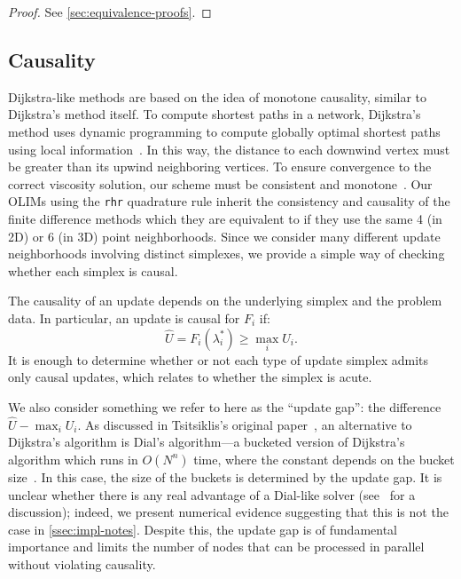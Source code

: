 \documentclass{article}
\begin{document}
\begin{proof}
  See \cref{sec:equivalence-proofs}.
\end{proof}

\subsection{Causality}\label{ssec:causality} Dijkstra-like
methods are based on the idea of monotone causality, similar to
Dijkstra's method itself. To compute shortest paths in a network,
Dijkstra's method uses dynamic programming to compute globally optimal
shortest paths using local information~\cite{dijkstra1959note}. In
this way, the distance to each downwind vertex must be greater than
its upwind neighboring vertices. To ensure convergence to the correct
viscosity solution, our scheme must be consistent and
monotone~\cite{crandall1983viscosity}. Our OLIMs using the
\texttt{rhr} quadrature rule inherit the consistency and causality of
the finite difference methods which they are equivalent to if they use
the same 4 (in 2D) or 6 (in 3D) point neighborhoods. Since we consider
many different update neighborhoods involving distinct simplexes, we
provide a simple way of checking whether each simplex is causal.

The causality of an update depends on the underlying simplex and the
problem data. In particular, an update is causal for $F_i$ if:
\begin{equation}
  \hat{U} = F_i(\lambda_i^*) \geq \max_i U_i.
\end{equation}
It is enough to determine whether or not each type of update simplex
admits only causal updates, which relates to whether the simplex is
acute.

We also consider something we refer to here as the ``update gap'': the
difference $\hat{U} - \max_i U_i$. As discussed in Tsitsiklis's
original paper~\cite{tsitsiklis1995efficient}, an alternative to
Dijkstra's algorithm is Dial's algorithm---a bucketed version of
Dijkstra's algorithm which runs in $O(N^n)$ time, where the constant
depends on the bucket size~\cite{dial1969algorithm,kim2001calo}. In
this case, the size of the buckets is determined by the update gap. It
is unclear whether there is any real advantage of a Dial-like solver
(see~\cite{jeong2008fast} for a discussion); indeed, we present
numerical evidence suggesting that this is not the case in
\cref{ssec:impl-notes}. Despite this, the update gap is of fundamental
importance and limits the number of nodes that can be processed in
parallel without violating causality.
\end{document}
